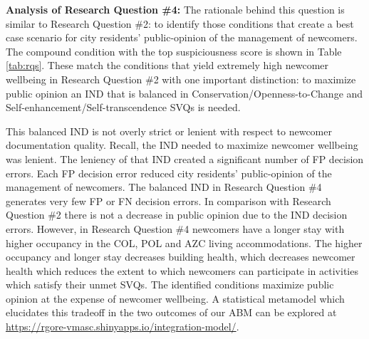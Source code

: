 \documentclass{scspaperproc}
\theoremstyle{scsthe}
\begin{document}


{\bf Analysis of Research Question \#4:} The rationale behind this question is similar to Research Question \#2: to identify those conditions that create a best case scenario for city residents' public-opinion of the management of newcomers. The compound condition with the top suspiciousness score is shown in Table \ref{tab:rqs}. These match the conditions that yield extremely high newcomer wellbeing in Research Question \#2 with one important distinction: to maximize public opinion an IND that is balanced in Conservation/Openness-to-Change and Self-enhancement/Self-transcendence SVQs is needed. 

This balanced IND is not overly strict or lenient with respect to newcomer documentation quality. Recall, the IND needed to maximize newcomer wellbeing was lenient.  The leniency of that IND created a significant number of FP decision errors. Each FP decision error reduced city residents' public-opinion of the management of newcomers. The balanced IND in Research Question \#4 generates very few FP or FN decision errors. In comparison with Research Question \#2 there is not a decrease in public opinion due to the IND decision errors. However, in Research Question \#4 newcomers have a longer stay with higher occupancy in the COL, POL and AZC living accommodations. The higher occupancy and longer stay decreases building health, which decreases newcomer health which reduces the extent to which newcomers can participate in activities which satisfy their unmet SVQs. The identified conditions maximize public opinion at the expense of newcomer wellbeing. A statistical metamodel which elucidates this tradeoff in the two outcomes of our ABM can be explored at \url{https://rgore-vmasc.shinyapps.io/integration-model/}. %
\end{document}
